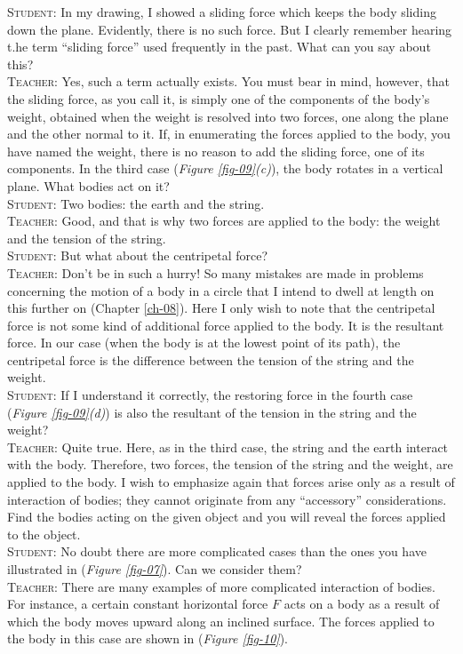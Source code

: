 \documentclass[a4paper,sfsidenotes]{tufte-book}
\begin{document}
\textsc{Student:} In my drawing, I showed a sliding force which keeps the body sliding down the plane. Evidently, there is no such force. But I clearly remember hearing t.he term ``sliding force'' used frequently in the past. What can you say about this?
 \\
\textsc{Teacher:} Yes, such a term actually exists. You must bear in mind, however, that the sliding force, as you call it, is simply one of the components of the body's weight, obtained when the weight is resolved into two forces, one along the plane and the other normal to it. If, in enumerating the forces applied to the body, you have named the weight, there is no reason to add the sliding force, one of its components. In the third case (\emph{Figure \ref{fig-09}(c)}), the body rotates in a vertical
plane. What bodies act on it?
 \\
\textsc{Student:} Two bodies: the earth and the string. 
\\
\textsc{Teacher:} Good, and that is why two forces are applied to the body: the weight and the tension of the string. 
\\ 
\textsc{Student:} But what about the centripetal force? 
\\
\textsc{Teacher:} Don't be in such a hurry! So many mistakes are made in problems concerning the motion of a body in a circle that I intend to dwell at length on this further on (Chapter \ref{ch-08}).
Here I only wish to note that the centripetal force is not some kind of additional force applied to the body. It is the resultant force. In our case (when the body is at the lowest point of its path), the centripetal force is the difference between the tension of the string and the weight.
\\
\textsc{Student:} If I understand it correctly, the restoring force in the fourth case  (\emph{Figure \ref{fig-09}(d)}) is also the resultant of the tension in the string and the weight? 
\\
\textsc{Teacher:} Quite true. Here, as in the third case, the string and the earth interact with the body. Therefore, two forces, the tension of the string and the weight, are applied to the body.
I wish to emphasize again that forces arise only as a result of interaction of bodies; they cannot originate from any ``accessory'' considerations. Find the bodies acting on the given object and you will reveal the forces applied to the object.
\\
\textsc{Student:} No doubt there are more complicated cases than the ones you have illustrated in  (\emph{Figure \ref{fig-07}}). Can we consider them?
\\
\textsc{Teacher:} There are many examples of more complicated interaction of bodies. For instance, a certain constant horizontal force $F$ acts on a body as a result of which the body moves upward along an inclined surface. The forces applied to the body in this case are shown in  (\emph{Figure \ref{fig-10}}).
\end{document}
